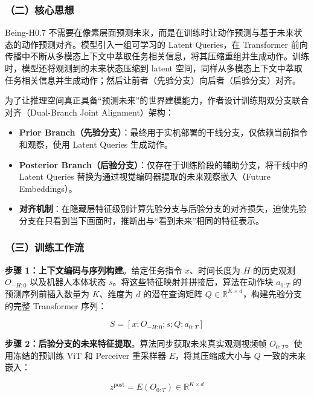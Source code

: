 \hypertarget{ux4e8cux6838ux5fc3ux601dux60f3-8}{%
\subsubsection{（二）核心思想}\label{ux4e8cux6838ux5fc3ux601dux60f3-8}}

Being-H0.7 不需要在像素层面预测未来，而是在训练时让动作预测与基于未来状态的动作预测对齐。模型引入一组可学习的 Latent Queries，在 Transformer 前向传播中不断从多模态上下文中萃取任务相关信息，将其压缩重组并生成动作。训练时，模型还将观测到的未来状态压缩到 latent 空间，同样从多模态上下文中萃取任务相关信息并生成动作；然后让前者（先验分支）向后者（后验分支）对齐。

为了让推理空间真正具备``预测未来''的世界建模能力，作者设计训练期双分支联合对齐（Dual-Branch Joint Alignment）架构：

\begin{itemize}
\tightlist
\item
  \textbf{Prior Branch（先验分支）}：最终用于实机部署的干线分支，仅依赖当前指令和观察，使用 Latent Queries 生成动作。
\item
  \textbf{Posterior Branch（后验分支）}：仅存在于训练阶段的辅助分支，将干线中的 Latent Queries 替换为通过视觉编码器提取的未来观察嵌入（Future Embeddings）。
\item
  \textbf{对齐机制}：在隐藏层特征级别计算先验分支与后验分支的对齐损失，迫使先验分支在只看到当下画面时，推断出与``看到未来''相同的特征表示。
\end{itemize}

\hypertarget{ux4e09ux8badux7ec3ux5de5ux4f5cux6d41-4}{%
\subsubsection{（三）训练工作流}\label{ux4e09ux8badux7ec3ux5de5ux4f5cux6d41-4}}

\textbf{步骤 1：上下文编码与序列构建}。给定任务指令 \(x\)、时间长度为 \(H\) 的历史观测 \(O_{-H:0}\) 以及机器人本体状态 \(s\)。将这些特征映射并拼接后，算法在动作块 \(a_{0:T}\) 的预测序列前插入数量为 \(K\)、维度为 \(d\) 的潜在查询矩阵 \(Q \in \mathbb{R}^{K \times d}\)，构建先验分支的完整 Transformer 序列：

\[
S = \left[x; O_{-H:0}; s; Q; a_{0:T}\right]
\]

\textbf{步骤 2：后验分支的未来特征提取}。算法同步获取未来真实观测视频帧 \(O_{0:T}\)。使用冻结的预训练 ViT 和 Perceiver 重采样器 \(E\)，将其压缩成大小与 \(Q\) 一致的未来嵌入：

\[
z^{\mathrm{post}} = E(O_{0:T}) \in \mathbb{R}^{K \times d}
\]

